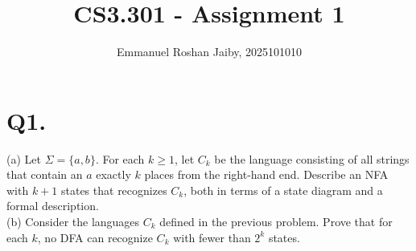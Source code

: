 \documentclass[]{article}
\title{CS3.301 - Assignment 1}
\author{Emmanuel Roshan Jaiby, 2025101010}
\date{}
\begin{document}
	\maketitle
	
	\section*{Q1.}
	(a) Let $\Sigma = \{a, b\}$. For each $k \geq 1$, let $C_{k}$ be the language consisting of all strings that contain an $a$ exactly $k$ places from the right-hand end. Describe an NFA with $k+1$ states that recognizes $C_{k}$, both in terms of a state diagram and a formal description.  \\
	(b) Consider the languages $C_k$ defined in the previous problem. Prove that for each $k$, no DFA can recognize $C_k$ with fewer than $2^{k}$ states.
\end{document}
